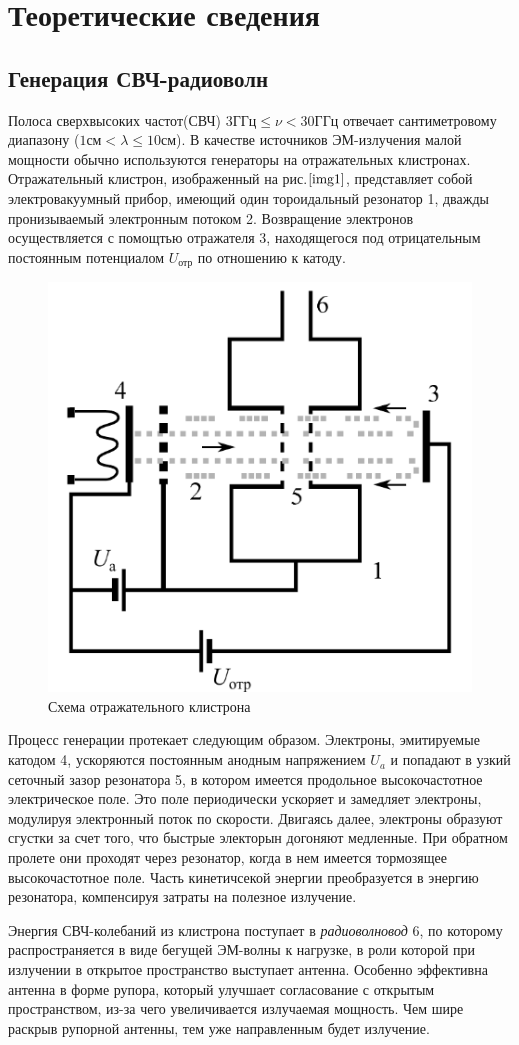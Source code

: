 \documentclass[a4paper,12pt]{article}
\begin{document}
\section{Теоретические сведения}
\subsection{Генерация СВЧ-радиоволн}

Полоса сверхвысоких частот(СВЧ) $3 \text{ГГц} \leq \nu < 30 \text{ГГц}$ отвечает сантиметровому диапазону ($1 \text{см} < \lambda \leq 10 \text{см}$). В качестве источников ЭМ-излучения малой мощности обычно используются генераторы на $\textit{отражательных клистронах}$. Отражательный клистрон, изображенный на рис.$\ref{img1}$, представляет собой электровакуумный прибор, имеющий один тороидальный резонатор 1, дважды пронизываемый электронным потоком 2. Возвращение электронов осуществляется с помощтью отражателя 3, находящегося под отрицательным постоянным потенциалом $U_{\text{отр}}$ по отношению к катоду.

\begin{figure}[h]
\centering
\includegraphics[width=0.4\linewidth]{img1.png}
\caption{Схема отражательного клистрона}
\label{img1}
\end{figure}

Процесс генерации протекает следующим образом. Электроны, эмитируемые катодом 4, ускоряются постоянным анодным напряжением $U_a$ и попадают в узкий сеточный зазор резонатора 5, в котором имеется продольное высокочастотное электрическое поле. Это поле периодически ускоряет и замедляет электроны, модулируя электронный поток по скорости. Двигаясь далее, электроны образуют сгустки за счет того, что быстрые электорын догоняют медленные. При обратном пролете они проходят через резонатор, когда в нем имеется тормозящее высокочастотное поле. Часть кинетичсекой энергии преобразуется в энергию резонатора, компенсируя затраты на полезное излучение.

Энергия СВЧ-колебаний из клистрона поступает в \textit{радиоволновод} 6, по которому распространяется в виде бегущей ЭМ-волны к нагрузке, в роли которой при излучении в открытое пространство выступает антенна. Особенно эффективна антенна в форме рупора, который улучшает согласование с открытым пространством, из-за чего увеличивается излучаемая мощность. Чем шире раскрыв рупорной антенны, тем уже направленным будет излучение.
\end{document}
